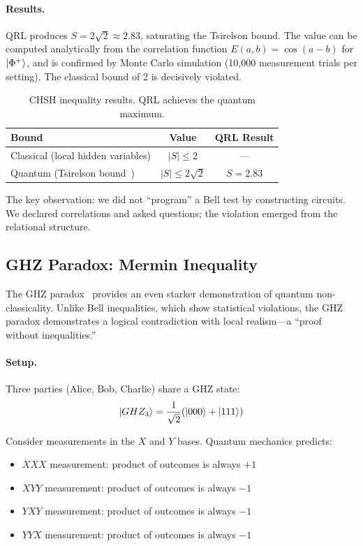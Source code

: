 \documentclass[submission,copyright,creativecommons]{eptcs}
\newcommand{\qrl}{\textsc{QRL}}
\begin{document}
\paragraph{Results.}
\qrl{} produces $S = 2\sqrt{2} \approx 2.83$, saturating the Tsirelson
bound. The value can be computed analytically from the correlation function
$E(a,b) = \cos(a - b)$ for $\ket{\Phi^+}$, and is confirmed by Monte Carlo
simulation (10{,}000 measurement trials per setting). The classical bound
of 2 is decisively violated.

\begin{table}[ht]
\centering
\begin{tabular}{lcc}
\toprule
\textbf{Bound} & \textbf{Value} & \textbf{QRL Result} \\
\midrule
Classical (local hidden variables) & $|S| \leq 2$ & --- \\
Quantum (Tsirelson bound~\cite{tsirelson1980}) & $|S| \leq 2\sqrt{2}$ & $S = 2.83$ \\
\bottomrule
\end{tabular}
\caption{CHSH inequality results. \qrl{} achieves the quantum maximum.}
\label{tab:chsh}
\end{table}

The key observation: we did not ``program'' a Bell test by constructing
circuits. We declared correlations and asked questions; the violation
emerged from the relational structure.

\subsection{GHZ Paradox: Mermin Inequality}

The GHZ paradox~\cite{ghz1989} provides an even starker demonstration of
quantum non-classicality. Unlike Bell inequalities, which show statistical
violations, the GHZ paradox demonstrates a logical contradiction with
local realism---a ``proof without inequalities.''

\paragraph{Setup.}
Three parties (Alice, Bob, Charlie) share a GHZ state:
\begin{equation}
\ket{GHZ_3} = \frac{1}{\sqrt{2}}(\ket{000} + \ket{111})
\end{equation}

Consider measurements in the $X$ and $Y$ bases. Quantum mechanics predicts:
\begin{itemize}
    \item $XXX$ measurement: product of outcomes is always $+1$
    \item $XYY$ measurement: product of outcomes is always $-1$
    \item $YXY$ measurement: product of outcomes is always $-1$
    \item $YYX$ measurement: product of outcomes is always $-1$
\end{itemize}
\end{document}
